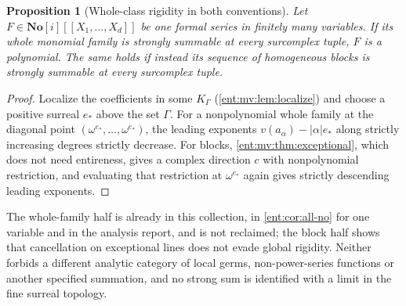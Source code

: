 \documentclass[11pt]{article}
\theoremstyle{plain}
\theoremstyle{plain}
\newtheorem{proposition}[proposition]{Proposition}
\theoremstyle{plain}
\theoremstyle{definition}
\theoremstyle{definition}
\theoremstyle{definition}
\theoremstyle{definition}
\theoremstyle{remark}
\newcommand{\No}{\mathbf{No}}
\newcommand{\K}{K_\Gamma}\newcommand{\KD}{K_\Delta}
\begin{document}
\begin{proposition}[Whole-class rigidity in both conventions]
\label{ent:mv:prop:allscale}
Let $F\in\No[i][[X_1,\ldots,X_d]]$ be one formal series in finitely many
variables. If its whole monomial family is strongly summable at every
surcomplex tuple, $F$ is a polynomial. The same holds if instead its
sequence of homogeneous blocks is strongly summable at every surcomplex
tuple.
\end{proposition}
\begin{proof}
Localize the coefficients in some $\K$ (\cref{ent:mv:lem:localize}) and choose
a positive surreal $e_*$ above the set $\Gamma$. For a nonpolynomial whole
family at the diagonal point $(\omega^{e_*},\ldots,\omega^{e_*})$, the leading
exponents $v(a_\alpha)-|\alpha|e_*$ along strictly increasing degrees
strictly decrease. For blocks, \cref{ent:mv:thm:exceptional}, which does not
need entireness, gives a complex direction $c$ with nonpolynomial restriction,
and evaluating that restriction at $\omega^{e_*}$ again gives strictly
descending leading exponents.
\end{proof}

The whole-family half is already in this collection, in \cref{ent:cor:all-no}
for one variable and in the analysis report, and is not reclaimed; the block
half shows that cancellation on exceptional lines does not evade global
rigidity. Neither forbids a different analytic category of local germs,
non-power-series functions or another specified summation, and no strong sum
is identified with a limit in the fine surreal topology.
\end{document}
